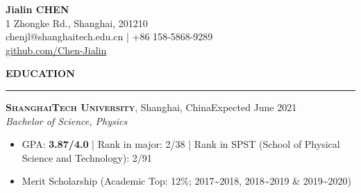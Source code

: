\documentclass[letterpaper,11pt]{article}
\begin{document}
\begin{center}
    {\LARGE\bfseries{}Jialin CHEN}\\
    \vspace{1ex}
    1 Zhongke Rd., Shanghai, 201210\\
    chenjl@shanghaitech.edu.cn | +86 158-5868-9289\\
    \href{https://github.com/Chen-Jialin}{github.com/Chen-Jialin}\\
\end{center}
\vspace{-1ex}

{\Large\bfseries{}EDUCATION}\\
\vspace{-1ex}
\rule[1.5ex]{\columnwidth}{1pt}
{\large\bfseries\scshape{}ShanghaiTech University}, {Shanghai, China}\hfill{Expected June 2021}\\
{\itshape{}Bachelor of Science, Physics}\\
\vspace{-4ex}
\begin{itemize}
    \item GPA: \textbf{3.87/4.0} | Rank in major: 2/38 | Rank in SPST (School of Physical Science and Technology): 2/91
    \item Merit Scholarship (Academic Top: 12\%; 2017\textasciitilde2018, 2018\textasciitilde2019 \& 2019\textasciitilde2020)
\end{itemize}
\end{document}
